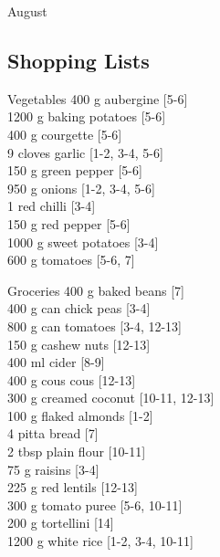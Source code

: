 \begin{menu}{August}
    \subsection*{Shopping Lists}
      \begin{shoppinglist}{Vegetables}
      400 g aubergine {\scriptsize[5-6]}\\
      1200 g baking potatoes {\scriptsize[5-6]}\\
      400 g courgette {\scriptsize[5-6]}\\
      9 cloves garlic {\scriptsize[1-2, 3-4, 5-6]}\\
      150 g green pepper {\scriptsize[5-6]}\\
      950 g onions {\scriptsize[1-2, 3-4, 5-6]}\\
      1  red chilli {\scriptsize[3-4]}\\
      150 g red pepper {\scriptsize[5-6]}\\
      1000 g sweet potatoes {\scriptsize[3-4]}\\
      600 g tomatoes {\scriptsize[5-6, 7]}\\
      \end{shoppinglist}%
      \begin{shoppinglist}{Groceries}
      400 g baked beans {\scriptsize[7]}\\
      400 g can chick peas {\scriptsize[3-4]}\\
      800 g can tomatoes {\scriptsize[3-4, 12-13]}\\
      150 g cashew nuts {\scriptsize[12-13]}\\
      400 ml cider {\scriptsize[8-9]}\\
      400 g cous cous {\scriptsize[12-13]}\\
      300 g creamed coconut {\scriptsize[10-11, 12-13]}\\
      100 g flaked almonds {\scriptsize[1-2]}\\
      4  pitta bread {\scriptsize[7]}\\
      2 tbsp plain flour {\scriptsize[10-11]}\\
      75 g raisins {\scriptsize[3-4]}\\
      225 g red lentils {\scriptsize[12-13]}\\
      300 g tomato puree {\scriptsize[5-6, 10-11]}\\
      200 g tortellini {\scriptsize[14]}\\
      1200 g white rice {\scriptsize[1-2, 3-4, 10-11]}\\

\end{shoppinglist}
\end{menu}
